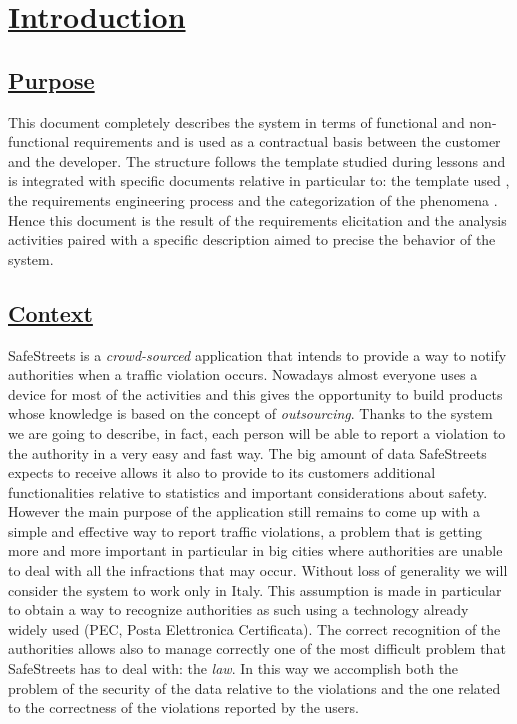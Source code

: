 \section[Introduction]{\hyperlink{toc}{Introduction}}
\label{sec:introduction}
\subsection[Purpose]{\hyperlink{toc}{Purpose}}
	\label{sec:purpose}
	This document completely describes the system in terms of functional and non-functional requirements and is used as a contractual basis between the customer and the developer. The structure follows the template studied during lessons and is integrated with specific documents relative in particular to: the template used \cite{IEEErasd}, the requirements engineering process \cite{IEEEre} and the categorization of the phenomena \cite{W&M}. Hence this document is the result of the requirements elicitation and the analysis activities paired with a specific description aimed to precise the behavior of the system.
	
\subsection[Context]{\hyperlink{toc}{Context}}
	SafeStreets is a \emph{crowd-sourced} application that intends to provide a way to notify authorities when a traffic violation occurs. Nowadays almost everyone uses a device for most of the activities and this gives the opportunity to build products whose knowledge is based on the concept of \emph{outsourcing}. Thanks to the system we are going to describe, in fact, each person will be able to report a violation to the authority in a very easy and fast way. The big amount of data SafeStreets expects to receive allows it also to provide to its customers additional functionalities relative to statistics and important considerations about safety. However the main purpose of the application still remains to come up with a simple and effective way to report traffic violations, a problem that is getting more and more important in particular in big cities where authorities are unable to deal with all the infractions that may occur. Without loss of generality we will consider the system to work only in Italy. This assumption is made in particular to obtain a way to recognize authorities as such using a technology already widely used (PEC, Posta Elettronica Certificata). The correct recognition of the authorities allows also to manage correctly one of the most difficult problem that SafeStreets has to deal with: the \emph{law}. In this way we accomplish both the problem of the security of the data relative to the violations and the one related to the correctness of the violations reported by the users.
	
